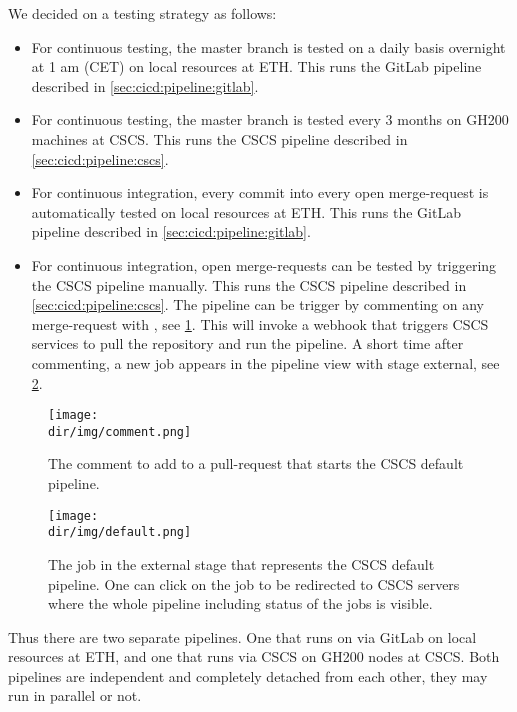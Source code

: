 We decided on a testing strategy as follows:
\begin{itemize}
    \item For continuous testing, the master branch is tested on a daily basis overnight at 1 am (CET) on local resources at ETH. This runs the GitLab pipeline described in \cref{sec:cicd:pipeline:gitlab}.
    \item For continuous testing, the master branch is tested every 3 months on GH200 machines at CSCS. This runs the CSCS pipeline described in \cref{sec:cicd:pipeline:cscs}.
    \item For continuous integration, every commit into every open merge-request is automatically tested on local resources at ETH. This runs the GitLab pipeline described in \cref{sec:cicd:pipeline:gitlab}.
    \item{For continuous integration, open merge-requests can be tested by triggering the CSCS pipeline manually. This runs the CSCS pipeline described in \cref{sec:cicd:pipeline:cscs}. The pipeline can be trigger by commenting on any merge-request with , see \cref{fig:cicd:comment}. This will invoke a webhook that triggers CSCS services to pull the repository and run the pipeline. A short time after commenting, a new job appears in the pipeline view with stage external, see \cref{fig:cicd:external}.}
\end{itemize}

\begin{figure}
    \centering
    \texttt{[image: \\dir/img/comment.png]}
    \caption{The comment to add to a pull-request that starts the CSCS default pipeline.}
    \label{fig:cicd:comment}
\end{figure}

\begin{figure}
    \centering
    \texttt{[image: \\dir/img/default.png]}
    \caption{The job in the external stage that represents the CSCS default pipeline. One can click on the job to be redirected to CSCS servers where the whole pipeline including status of the jobs is visible.}
    \label{fig:cicd:external}
\end{figure}

Thus there are two separate pipelines.
One that runs on via GitLab on local resources at ETH, and one that runs via CSCS on GH200 nodes at CSCS.
Both pipelines are independent and completely detached from each other, they may run in parallel or not.

